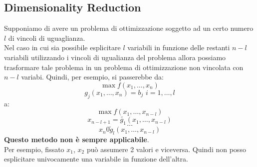 \message{ !name(ro.tex)}\documentclass[a4paper,12pt, oneside]{book}
\begin{document}
\subsection{Dimensionality Reduction}
Supponiamo di avere un problema di ottimizzazione soggetto ad un certo
numero $l$ di vincoli di uguaglianza.\\
Nel caso in cui sia possibile esplicitare $l$ variabili in funzione delle
restanti $n-l$ variabili utilizzando i vincoli di ugualianza del problema
allora possiamo trasformare tale problema in un problema di
ottimizzazione non vincolata con $n-l$ variabi. Quindi, per esempio,
si passerebbe da:
\[\max f(x_1,\ldots, x_n)\]
\[g_j(x_1,\ldots, x_n)=b_j\,\,i=1,\ldots, l\]
a:
\[\max f(x_1,\ldots, x_{n-l})\]
\[x_{n-l+1}=\widetilde{g_1}(x_1,\ldots, x_{n-l})\]
\[\ldots\]
\[x_n0\widetilde{g}_l(x_1,\ldots,x_{n-l})\]
\textbf{Questo metodo non è sempre applicabile}.\\
Per esempio, fissato $x_1$, $x_2$ può assumere 2 valori e viceversa.
Quindi non posso esplicitare univocamente una variabile in funzione
dell’altra.  
\end{document}
